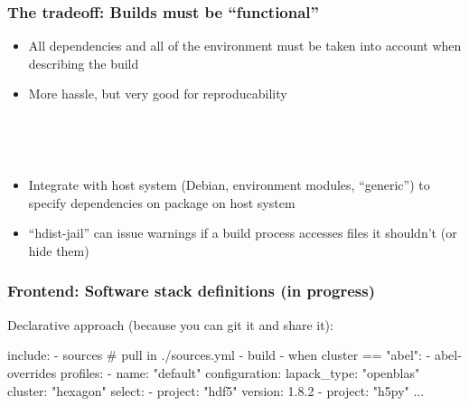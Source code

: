 \documentclass[sans,mathserif]{beamer}
\begin{document}
\begin{frame}
  \frametitle{The tradeoff: Builds must be ``functional''}

  \begin{itemize}
  \item<+-> All dependencies and all of the environment must be
    taken into account when describing the build
  \item<+-> More hassle, but very good for reproducability
  \end{itemize}

~
 

~

\begin{itemize}
\item<+-> Integrate with host system (Debian, environment modules,
  ``generic'') to specify dependencies on package on host system
\item<+-> ``hdist-jail'' can issue warnings if a build process
  accesses files it shouldn't (or hide them)

\end{itemize}

\end{frame}



\begin{frame}[fragile]
\frametitle{Frontend: Software stack definitions (in progress)}
Declarative approach (because you can git it and share it):

{\small

\begin{semiverbatim}
include:
  - sources # pull in ./sources.yml
  - build
  - when cluster == "abel":
    - abel-overrides
profiles:
  - name: "default"
    configuration:
      lapack_type: "openblas"
      cluster: "hexagon"
    select:
      - project: "hdf5"
        version: 1.8.2
      - project: "h5py"
        ...
\end{semiverbatim}
}
\end{frame}
\end{document}
